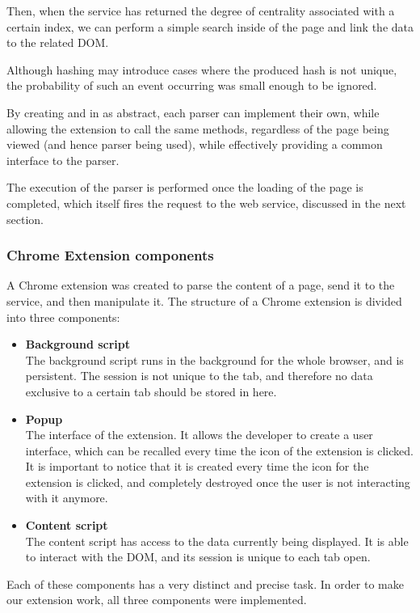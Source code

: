 Then, when the service has returned the degree of centrality associated with a certain index, we can perform a simple search inside of the page and link the data to the related DOM. 

Although hashing may introduce cases where the produced hash is not unique, the probability of such an event occurring was small enough to be ignored.

By creating  and  in  as abstract, each parser can implement their own, while allowing the extension to call the same methods, regardless of the page being viewed (and hence parser being used), while effectively providing a common interface to the parser. 

The execution of the parser is performed once the loading of the page is completed, which itself fires the request to the web service, discussed in the next section.


\subsubsection{Chrome Extension components}
A Chrome extension was created to parse the content of a page, send it to the service, and then manipulate it. The structure of a Chrome extension is divided into three components:
\begin{itemize}
\item \textbf{Background script}\\
The background script runs in the background for the whole browser, and is persistent. The session is not unique to the tab, and therefore no data exclusive to a certain tab should be stored in here.
\item \textbf{Popup}\\
The interface of the extension. It allows the developer to create a user interface, which can be recalled every time the icon of the extension is clicked. It is important to notice that it is created every time the icon for the extension is clicked, and completely destroyed once the user is not interacting with it anymore. 
\item \textbf{Content script}\\
The content script has access to the data currently being displayed. It is able to interact with the DOM, and its session is unique to each tab open. 
\end{itemize}
Each of these components has a very distinct and precise task. In order to make our extension work, all three components were implemented. 

